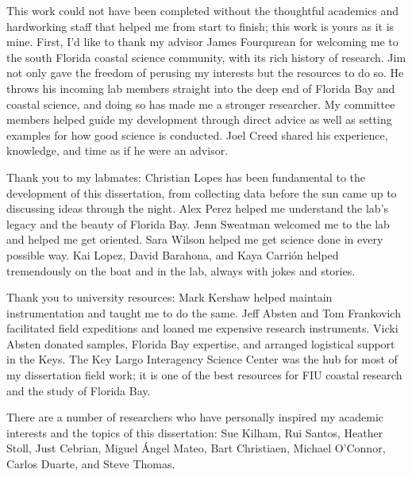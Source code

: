 \begin{acknowledgments}

\indent This work could not have been completed without the thoughtful academics and hardworking staff that helped me from start to finish; this work is yours as it is mine. First, I’d like to thank my advisor James Fourqurean for welcoming me to the south Florida coastal science community, with its rich history of research. Jim not only gave the freedom of perusing my interests but the resources to do so. He throws his incoming lab members straight into the deep end of Florida Bay and coastal science, and doing so has made me a stronger researcher. My committee members helped guide my development through direct advice as well as setting examples for how good science is conducted. Joel Creed shared his experience, knowledge, and time as if he were an advisor.

Thank you to my labmates: Christian Lopes has been fundamental to the development of this dissertation, from collecting data before the sun came up to discussing ideas through the night. Alex Perez helped me understand the lab’s legacy and the beauty of Florida Bay. Jenn Sweatman welcomed me to the lab and helped me get oriented. Sara Wilson helped me get science done in every possible way. Kai Lopez, David Barahona, and Kaya Carrión helped tremendously on the boat and in the lab, always with jokes and stories.

Thank you to university resources: Mark Kershaw helped maintain instrumentation and taught me to do the same. Jeff Absten and Tom Frankovich facilitated field expeditions and loaned me expensive research instruments. Vicki Absten donated samples, Florida Bay expertise, and arranged logistical support in the Keys. The Key Largo Interagency Science Center was the hub for most of my dissertation field work; it is one of the best resources for FIU coastal research and the study of Florida Bay.

There are a number of researchers who have personally inspired my academic interests and the topics of this dissertation: Sue Kilham, Rui Santos, Heather Stoll, Just Cebrian, Miguel Ángel Mateo, Bart Christiaen, Michael O'Connor, Carlos Duarte, and Steve Thomas.
\end{acknowledgments}

\begin{abstract}

\end{abstract}

\contentspage

\tablelistpage

\figurelistpage


